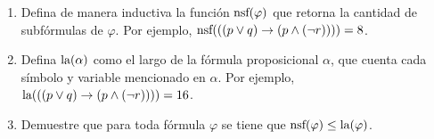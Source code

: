 \begin{enumerate}[label=(\alph*)]

	\item Defina de manera inductiva la función $\text{nsf}(\varphi)$ que retorna la cantidad de subfórmulas de $\varphi$.  Por ejemplo, $\text{nsf}(((p \vee q) \to (p \wedge (\neg r)))) = 8$.

	\item Defina $\text{la}(\alpha)$ como el largo de la fórmula proposicional $\alpha$, que cuenta cada símbolo y variable mencionado en $\alpha$. Por ejemplo, $\text{la}(((p \vee q) \to (p \wedge (\neg r))))=16$.
    
    \item Demuestre que para toda fórmula $\varphi$ se tiene que $\text{nsf}(\varphi) \leq \text{la}(\varphi)$. 
\end{enumerate}